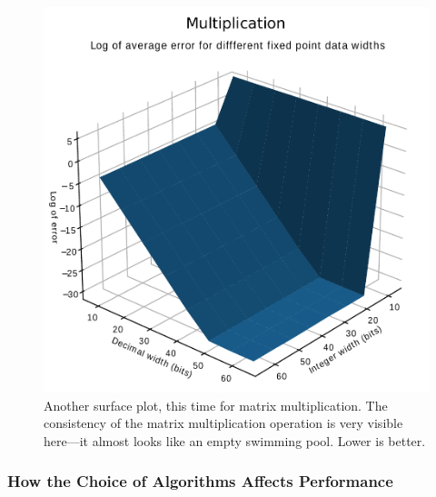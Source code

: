 \documentclass[12pt]{article}
\begin{document}
\begin{figure}[thp]
	\centering
	
	\includegraphics[width=\textwidth]{sfc_plot_full_mul.pdf}
	
	\caption{Another surface plot, this time for matrix multiplication. The consistency of the matrix multiplication operation is very visible here---it almost looks like an empty swimming pool. Lower is better.}
	\label{full_sfc_mul}
\end{figure}

\subsubsection{How the Choice of Algorithms Affects Performance}
\end{document}
